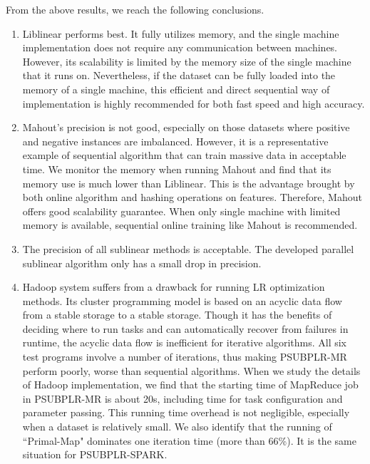 \documentclass[10pt, conference, compsocconf]{IEEEtran}
\begin{document}
From the above results, we reach the following conclusions.

\begin{enumerate}
\item Liblinear performs best. It fully utilizes memory, and the single machine implementation does not require any communication between machines.
          However, its scalability is limited by the memory size of the single machine that it runs on.
          Nevertheless, if the dataset can be fully loaded into the memory of a single machine, this efficient and direct sequential way of implementation is highly recommended for both fast speed and high accuracy.

\item Mahout's precision is not good, especially on those datasets where positive and negative instances are imbalanced.
          However, it is a representative example of sequential algorithm that can train massive data in acceptable time.
          We monitor the memory when running Mahout and find that its memory use is much lower than Liblinear. This is the advantage brought by both online algorithm and hashing operations on features.
          Therefore, Mahout offers good scalability guarantee. When only single machine with limited memory is available, sequential online training like Mahout is recommended.

\item The precision of all sublinear methods is acceptable. The developed parallel sublinear algorithm only has a small drop in precision.

\item  Hadoop system suffers from a drawback for running LR optimization methods. Its cluster programming model is based on an acyclic data flow from a stable storage to a stable storage.
          Though it has the benefits of deciding where to run tasks and can automatically recover from failures in runtime, the acyclic data flow is inefficient for iterative algorithms.
          All six test programs involve a number of iterations, thus making PSUBPLR-MR perform poorly, worse than sequential algorithms.
          When we study the details of Hadoop implementation, we find that the starting time of MapReduce job in PSUBPLR-MR is about 20s, including time for task configuration and parameter passing.
          This running time overhead is not negligible, especially when a dataset is relatively small.
          We also identify that the running of ``Primal-Map" dominates one iteration time (more than 66\%). It is the same situation for PSUBPLR-SPARK.


\end{enumerate}
\end{document}
